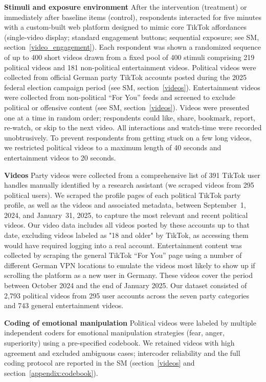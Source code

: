\documentclass[12pt]{article}
\begin{document}
\textbf{Stimuli and exposure environment}
After the intervention (treatment) or immediately after baseline items (control), respondents interacted for five minutes with a custom-built web platform designed to mimic core TikTok affordances (single-video display; standard engagement buttons; sequential exposure; see SM, section~\ref{video_engagement}). Each respondent was shown a randomized sequence of up to 400 short videos drawn from a fixed pool of 400 stimuli comprising 219 political videos and 181 non-political entertainment videos. Political videos were collected from official German party TikTok accounts posted during the 2025 federal election campaign period (see SM, section~\ref{videos}). Entertainment videos were collected from non-political “For You” feeds and screened to exclude political or offensive content (see SM, section~\ref{videos}). Videos were presented one at a time in random order; respondents could like, share, bookmark, report, re-watch, or skip to the next video. All interactions and watch-time were recorded unobtrusively. To prevent respondents from getting stuck on a few long videos, we restricted political videos to a maximum length of 40 seconds and entertainment videos to 20 seconds. 


\textbf{Videos}
Party videos were collected from a comprehensive list of 391 TikTok user handles manually identified by a research assistant (we scraped videos from 295 political users). We scraped the profile pages of each political TikTok party profile, as well as the videos and associated metadata, between September~1, 2024, and January~31, 2025, to capture the most relevant and recent political videos. Our video data includes all videos posted by these accounts up to that date, excluding videos labeled as "18 and older" by TikTok, as accessing them would have required logging into a real account. Entertainment content was collected by scraping the general TikTok “For You” page using a number of different German VPN locations to emulate the videos most likely to show up if scrolling the platform as a new user in Germany. These videos cover the period between October 2024 and the end of January 2025. Our dataset consisted of 2,793 political videos from 295 user accounts across the seven party categories and 743 general entertainment videos. 

\textbf{Coding of emotional manipulation}
Political videos were labeled by multiple independent coders for emotional manipulation strategies (fear, anger, superiority) using a pre-specified codebook. We retained videos with high agreement and excluded ambiguous cases; intercoder reliability and the full coding protocol are reported in the SM (section~\ref{videos} and section~\ref{appendix:codebook}). 
\end{document}
